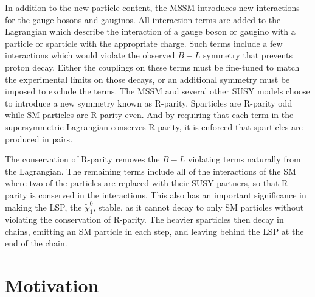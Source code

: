 In addition to the new particle content, the \ac{MSSM} introduces  new interactions for the gauge bosons and gauginos.
All interaction terms are added to the Lagrangian which describe the interaction of a gauge boson or gaugino with a particle or sparticle with the appropriate charge.
Such terms include a few interactions which would violate the observed $B - L$ symmetry that prevents proton decay.
Either the couplings on these terms must be fine-tuned to match the experimental limits on those decays, or an additional symmetry must be imposed to exclude the terms.
The \ac{MSSM} and several other \ac{SUSY} models choose to introduce a new symmetry known as R-parity.
Sparticles are R-parity odd while \ac{SM} particles are R-parity even.
And by requiring that each term in the supersymmetric Lagrangian conserves R-parity, it is enforced that sparticles are produced in pairs.

The conservation of R-parity removes the $B-L$ violating terms naturally from the Lagrangian.
The remaining terms include all of the interactions of the \ac{SM} where two of the particles are replaced with their \ac{SUSY} partners, so that R-parity is conserved in the interactions.
This also has an important significance in making the \ac{LSP}, the $\tilde{\chi}_1^0$, stable, as it cannot decay to only \ac{SM} particles without violating the conservation of R-parity.
The heavier sparticles then decay in chains, emitting an \ac{SM} particle in each step, and leaving behind the \ac{LSP} at the end of the chain.

\section{Motivation}

